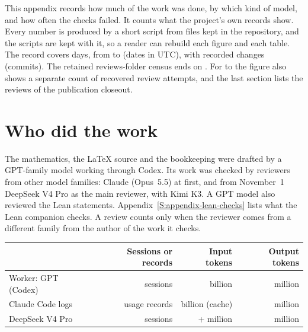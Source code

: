 
This appendix records how much of the work was done, by which kind of model,
and how often the checks failed. It counts what the project's own records
show. Every number is produced by a short script from files kept in the
repository, and the scripts are kept with it, so a reader can rebuild each
figure and each table. The record covers \aiDays{} days, from \aiFirstDay{}
to \aiLastDay{} (dates in UTC), with \aiCommits{} recorded changes (commits).
The retained reviews-folder census ends on \aiReviewLastDay{}. For \aiLaterFirstDay{}
to \aiLaterLastDay{} the figure also shows a separate count of recovered
review attempts, and the last section lists the reviews of the publication
closeout.

\section*{Who did the work}

The mathematics, the \LaTeX{} source and the bookkeeping were drafted by a
GPT-family model working through Codex. Its work was checked by reviewers from
other model families: Claude (Opus~5.5) at first, and from November~1 DeepSeek
V4 Pro as the main reviewer, with Kimi K3. A GPT model also reviewed the Lean
statements. Appendix~\ref{S:appendix-lean-checks} lists what the Lean companion
checks. A review counts only when the reviewer comes from a different family
from the author of the work it checks.

\begin{center}
\small
\begin{tabular}{@{}lrrr@{}}
  \toprule
  & Sessions or records & Input tokens & Output tokens \\
  \midrule
  Worker: GPT (Codex) & \aiCodexSessions{} sessions & \aiCodexInB{} billion
  & \aiCodexOutM{} million \\
  Claude Code logs & \aiClaudeCalls{} usage records
  & \aiClaudeCacheReadB{} billion (cache) & \aiClaudeOutM{} million \\
  DeepSeek V4 Pro & \aiDeepSeekSessions{} sessions & \aiDeepSeekInM{} +
  \aiDeepSeekCacheM{} million & \aiDeepSeekOutM{} million \\
  \bottomrule
\end{tabular}
\end{center}

